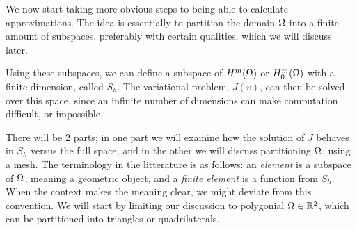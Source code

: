 We now start taking more obvious steps to being able to calculate approximations. 
The idea is essentially to partition the domain $\Omega$ into a finite amount 
of subspaces, preferably with certain qualities, which we will discuss later. 

Using these subspaces, we can define a subspace of $H^m(\Omega)$ or $H^m_0(\Omega)$ 
with a finite dimension, called $S_h$. The variational problem, $J(v)$, can then be 
solved over this space, since an infinite number of dimensions can make 
computation difficult, or impossible.

There will be $2$ parts; in one part we 
will examine how the solution of $J$ behaves in $S_h$ versus the full space, 
and in the other we will discuss partitioning $\Omega$, using a mesh.
The terminology in the litterature is as follows: an \emph{element} is a 
subspace of $\Omega$, meaning a geometric object, and a \emph{finite element} is a 
function from $S_h$. When the context makes the meaning clear, we might deviate from 
this convention.
We will start by limiting our discussion to polygonial $\Omega \in \mathbb{R}^2$, which 
can be partitioned into triangles or quadrilaterals.